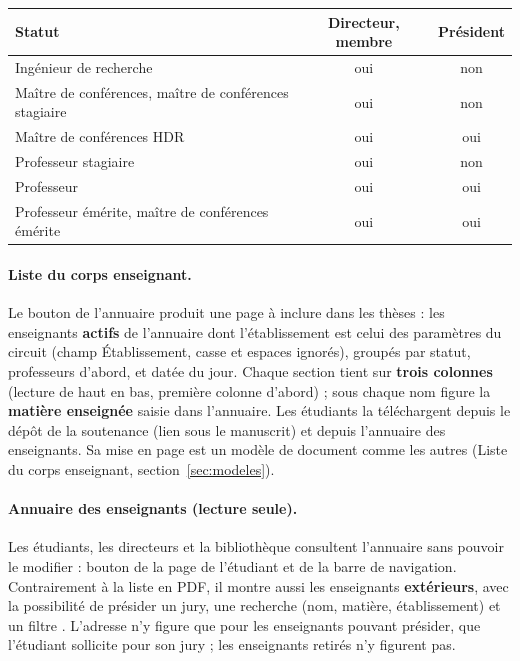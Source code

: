 \documentclass[11pt,a4paper]{article}
\begin{document}
\begin{center}
\small
\begin{tabularx}{\linewidth}{@{}X c c@{}}
\toprule
\textbf{Statut} & \textbf{Directeur, membre} & \textbf{Président} \\
\midrule
Ingénieur de recherche & oui & non \\
Maître de conférences, maître de conférences stagiaire & oui & non \\
Maître de conférences HDR & oui & oui \\
Professeur stagiaire & oui & non \\
Professeur & oui & oui \\
Professeur émérite, maître de conférences émérite & oui & oui \\
\bottomrule
\end{tabularx}
\end{center}


\paragraph{Liste du corps enseignant.} Le bouton  de l'annuaire produit une page à inclure dans les thèses :
les enseignants \textbf{actifs} de l'annuaire dont l'établissement est celui
des paramètres du circuit (champ \og Établissement\fg{}, casse et espaces
ignorés), groupés par statut, professeurs d'abord, et datée du jour. Chaque
section tient sur \textbf{trois colonnes} (lecture de haut en bas, première
colonne d'abord) ; sous chaque nom figure la \textbf{matière enseignée} saisie
dans l'annuaire. Les
étudiants la téléchargent depuis le dépôt de la soutenance (lien sous le
manuscrit) et depuis l'annuaire des enseignants. Sa mise en page est un modèle
de document comme les autres (\og Liste du corps enseignant\fg{},
section~\ref{sec:modeles}).

\paragraph{Annuaire des enseignants (lecture seule).} Les étudiants, les
directeurs et la bibliothèque consultent l'annuaire sans pouvoir le modifier :
bouton  de la page de l'étudiant et de la barre
de navigation. Contrairement à la liste en PDF, il montre aussi les enseignants
\textbf{extérieurs}, avec la possibilité de présider un jury, une recherche (nom,
matière, établissement) et un filtre . L'adresse n'y figure que pour les enseignants pouvant présider, que
l'étudiant sollicite pour son jury ; les enseignants retirés n'y figurent pas.
\end{document}
